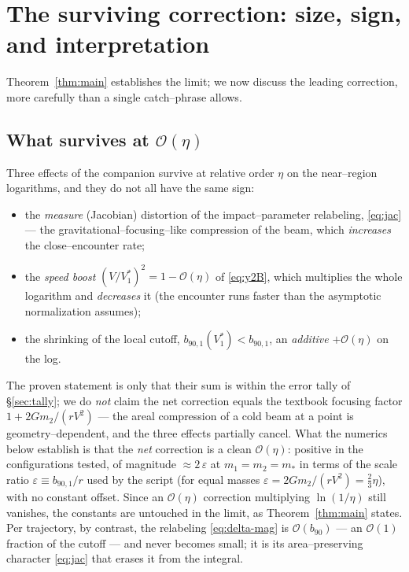 \documentclass[11pt]{article}
\newcommand{\bnt}{b_{90}}
\newcommand{\order}[1]{\mathcal O\!\left(#1\right)}
\begin{document}
\section{The surviving correction: size, sign, and interpretation}
\label{sec:focusing}

Theorem~\ref{thm:main} establishes the limit; we now discuss the leading correction, more carefully
than a single catch--phrase allows.

\subsection{What survives at $\order\eta$}
Three effects of the companion survive at relative order $\eta$ on the near--region logarithms, and
they do not all have the same sign:
\begin{itemize}
\item the \emph{measure} (Jacobian) distortion of the impact--parameter relabeling,
\eqref{eq:jac} --- the gravitational--focusing--like compression of the beam, which \emph{increases}
the close--encounter rate;
\item the \emph{speed boost} $(V/V_1^*)^2=1-\order\eta$ of \eqref{eq:y2B}, which multiplies the
whole logarithm and \emph{decreases} it (the encounter runs faster than the asymptotic
normalization assumes);
\item the shrinking of the local cutoff, $b_{90,1}(V_1^*)<b_{90,1}$, an \emph{additive}
$+\order\eta$ on the log.
\end{itemize}
The proven statement is only that their sum is within the error tally of \S\ref{sec:tally}; we do
\emph{not} claim the net correction equals the textbook focusing factor $1+2Gm_2/(rV^2)$ --- the
areal compression of a cold beam at a point is geometry--dependent, and the three effects partially
cancel. What the numerics below establish is that the \emph{net} correction is a clean
$\order\eta$: positive in the configurations tested, of magnitude $\approx2\,\varepsilon$ at
$m_1=m_2=m_*$ in terms of the scale ratio $\varepsilon\equiv b_{90,1}/r$ used by the script
(for equal masses $\varepsilon=2Gm_2/(rV^2)=\tfrac23\eta$), with no constant offset. Since an $\order\eta$
correction multiplying $\ln(1/\eta)$ still vanishes, the constants are untouched in the limit, as
Theorem~\ref{thm:main} states. Per trajectory, by contrast, the relabeling
\eqref{eq:delta-mag} is $\order{\bnt}$ --- an $\order1$ fraction of the cutoff --- and never becomes
small; it is its area--preserving character \eqref{eq:jac} that erases it from the integral.
\end{document}

